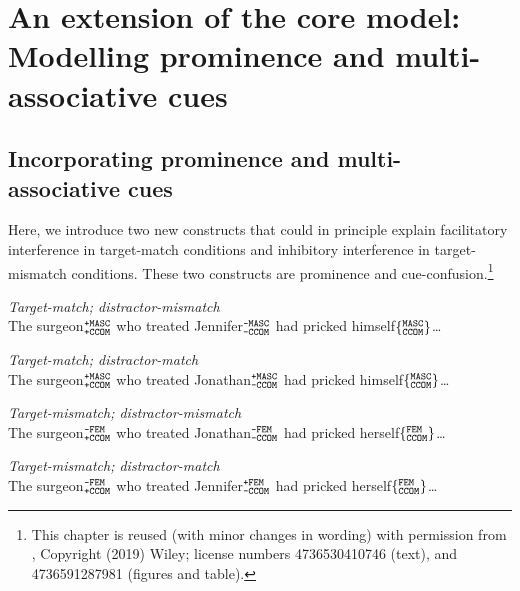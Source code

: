 \documentclass{cambridge7A}\usepackage[]{graphicx}\usepackage[]{color}
\newcommand{\featureset}[2]{$\{^{\texttt{\uppercase{#1}}}_{\texttt{\uppercase{#2}}}\}$}
\newcommand{\featuresetNP}[2]{$^{\texttt{\uppercase{#1}}}_{\texttt{\uppercase{#2}}}$}
\begin{document}

\chapter[Extension: Prominence and multi-associative cues]{An extension of the core model: Modelling prominence and multi-associative cues} \label{c02prominence}

\section{Incorporating prominence and multi-associative cues}

Here, we introduce two new constructs that could in principle explain facilitatory interference in target-match conditions and inhibitory interference in target-mismatch conditions. These two constructs are  prominence and  cue-confusion.\footnote{This chapter is reused (with minor changes in wording) with permission from \cite{EngelmannJaegerVasishth2019}, Copyright (2019) Wiley; license numbers 4736530410746 (text), and 4736591287981 (figures and table).}

\begin{exe}
\ex\label{ex:sturt03:exp2}
\begin{xlist}
\item \textit{Target-match; distractor-mismatch}\\
The surgeon\featuresetNP{+MASC}{+CCOM} who treated Jennifer\featuresetNP{-MASC}{-CCOM} had pricked himself\featureset{MASC}{CCOM}\dots
\item \textit{Target-match; distractor-match}\\
The surgeon\featuresetNP{+MASC}{+CCOM} who treated Jonathan\featuresetNP{+MASC}{-CCOM} had pricked himself\featureset{MASC}{CCOM}\dots
\item \textit{Target-mismatch; distractor-mismatch}\\
The surgeon\featuresetNP{-FEM}{+CCOM} who treated Jonathan\featuresetNP{-FEM}{-CCOM} had pricked herself\featureset{FEM}{CCOM}\dots
\item \textit{Target-mismatch; distractor-match}\\
The surgeon\featuresetNP{-FEM}{+CCOM} who treated Jennifer\featuresetNP{+FEM}{-CCOM} had pricked herself\featureset{FEM}{CCOM}\dots
\end{xlist}
\end{exe}
\end{document}
